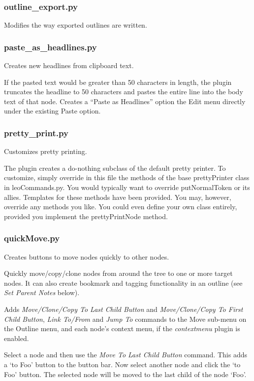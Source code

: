 \documentclass[a4paper,10pt,english]{sphinxmanual}
\begin{document}
\subsubsection{outline\_export.py}
\label{plugins:outline-export-py}
Modifies the way exported outlines are written.


\subsubsection{paste\_as\_headlines.py}
\label{plugins:paste-as-headlines-py}
Creates new headlines from clipboard text.

If the pasted text would be greater than 50 characters in length, the plugin
truncates the headline to 50 characters and pastes the entire line into the body
text of that node. Creates a ``Paste as Headlines'' option the Edit menu directly
under the existing Paste option.


\subsubsection{pretty\_print.py}
\label{plugins:pretty-print-py}
Customizes pretty printing.

The plugin creates a do-nothing subclass of the default pretty printer. To
customize, simply override in this file the methods of the base prettyPrinter
class in leoCommands.py. You would typically want to override putNormalToken or
its allies. Templates for these methods have been provided. You may, however,
override any methods you like. You could even define your own class entirely,
provided you implement the prettyPrintNode method.


\subsubsection{quickMove.py}
\label{plugins:quickmove-py}
Creates buttons to move nodes quickly to other nodes.

Quickly move/copy/clone nodes from around the tree to one or more target nodes.
It can also create bookmark and tagging functionality in an outline (see \emph{Set
Parent Notes} below).

Adds \emph{Move/Clone/Copy To Last Child Button} and \emph{Move/Clone/Copy To First Child Button},
\emph{Link To/From} and \emph{Jump To} commands to the Move sub-menu on the
Outline menu, and each node's context menu, if the \emph{contextmenu} plugin is enabled.

Select a node  and then use the \emph{Move To Last Child Button} command.
This adds a `to Foo' button to the button bar. Now select another node and click
the `to Foo' button. The selected node will be moved to the last child
of the node `Foo'.
\end{document}
